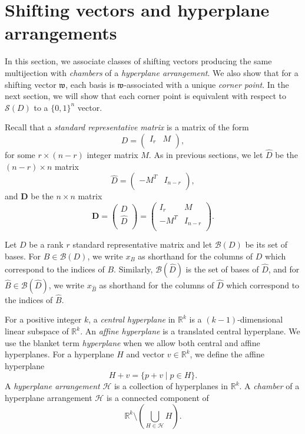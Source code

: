 \documentclass[ALCO,ThmDefs,Unicode,epreuves]{cedram}
\newcommand{\R}{\mathbb{R}}
\newcommand{\D}{\mathbf{D}}
\newcommand{\B}{\mathcal{B}}
\newcommand{\Sand}{\mathcal{S}}
\newcommand{\what}{\widehat}
\newcommand{\CB}{x_B}
\newcommand{\hCB}{x_{\widehat B}}
\newcommand{\w}{\mathfrak w}
\begin{document}
\section{Shifting vectors and hyperplane arrangements}\label{sec:shifting}

In this section, we associate classes of shifting vectors producing the same multijection with \emph{chambers} of a \emph{hyperplane arrangement}. We also show that for a shifting vector $\w$, each basis is $\w$-associated with a unique \emph{corner point}. In the next section, we will show that each corner point is equivalent with respect to $\Sand(D)$ to a $\{0,1\}^n$ vector.

Recall that a \emph{standard representative matrix} is a matrix of the form
\[
 D = \begin{pmatrix}
I_r &M \\
\end{pmatrix},
\]
for some $r \times (n-r)$ integer matrix $M$. As in previous sections, we let $\widehat D$ be the $(n-r) \times n$ matrix
\[
\widehat D = \begin{pmatrix}
-M^T & I_{n-r} \\
\end{pmatrix},
\]
and $\D$ be the $n\times n$ matrix
\[
 \D = \begin{pmatrix}
D \\
\widehat D \\
\end{pmatrix} =\begin{pmatrix}
I_r & M \\
-M^T & I_{n-r} \\
\end{pmatrix}.
\]

Let $D$ be a rank $r$ standard representative matrix and let $\B(D)$ be its set of bases. For $B \in \B(D)$, we write $\CB$ as shorthand for the columns of $D$ which correspond to the indices of $B$. Similarly, $\B(\widehat D)$ is the set of bases of $\what D$, and for $\what B \in \B(\what D)$, we write $\hCB$ as shorthand for the columns of $\widehat D$ which correspond to the indices of $\what B$. 

\begin{defi}
For a positive integer $k$, a \emph{central hyperplane} in $\R^k$ is a $(k-1)$-dimensional linear subspace of $\R^k$. An \emph{affine hyperplane} is a translated central hyperplane. We use the blanket term \emph{hyperplane} when we allow both central and affine hyperplanes. For a hyperplane $H$ and vector $v \in \R^k$, we define the affine hyperplane
\[
H+v = \{p+v\mid p \in H\}.
\]
A \emph{hyperplane arrangement} $\mathcal H$ is a collection of hyperplanes in $\R^k$. A \emph{chamber} of a hyperplane arrangement $\mathcal H$ is a connected component of
\[
\R^k \setminus \left(\bigcup_{H \in \mathcal H} H\right ) .
\]
\end{defi}
\end{document}
